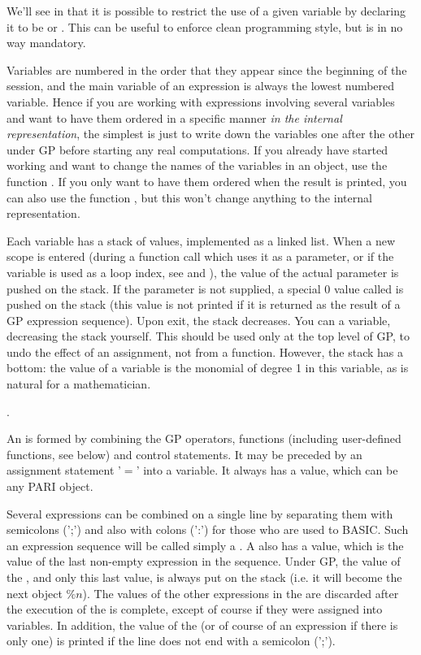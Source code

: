  We'll see in  that it is possible
to restrict the use of a given variable by declaring it to be  or
. This can be useful to enforce clean programming style, but is in
no way mandatory.

 Variables are numbered in the order that they
appear since the beginning of the session, and the main variable of an
expression is always the lowest numbered variable. Hence if you are working
with expressions involving several variables and want to have them ordered in
a specific manner {\it in the internal representation}, the simplest is just
to write down the variables one after the other under GP before starting any
real computations. If you already have started working and want to change the
names of the variables in an object, use the function . If you
only want to have them ordered when the result is printed, you can also use
the function , but this won't change anything to the internal
representation.

Each variable has a stack of values, implemented as a linked list. When a new
scope is entered (during a function call which uses it as a parameter, or if
the variable is used as a loop index, see  and
), the value of the actual parameter is pushed on the
stack. If the parameter is not supplied, a special $0$ value called
 is pushed on the stack (this value is not printed if it is
returned as the result of a GP expression sequence). Upon exit, the stack
decreases. You can  a variable, decreasing the stack yourself. This
should be used only at the top level of GP, to undo the effect of an
assignment, not from a function. However, the stack has a bottom: the value
of a variable is the monomial of degree 1 in this variable, as is natural for
a mathematician.

.

  An  is formed by combining the
GP operators, functions (including user-defined functions, see below) and
control statements. It may be preceded by an assignment statement '$=$'
into a variable. It always has a value, which can be any PARI object.

  Several expressions can be combined on a single line by separating them
with semicolons (';') and also with colons (':') for those who are used to
BASIC. Such an expression sequence will be called simply a . A
 also has a value, which is the value of the last non-empty
expression in the sequence. Under GP, the value of the , and only
this last value, is always put on the stack (i.e. it will become the next
object $\%n$). The values of the other expressions in the  are
discarded after the execution of the  is complete, except of
course if they were assigned into variables. In addition, the value of
the  (or of course of an expression if there is only one) is
printed if the line does not end with a semicolon (';').

